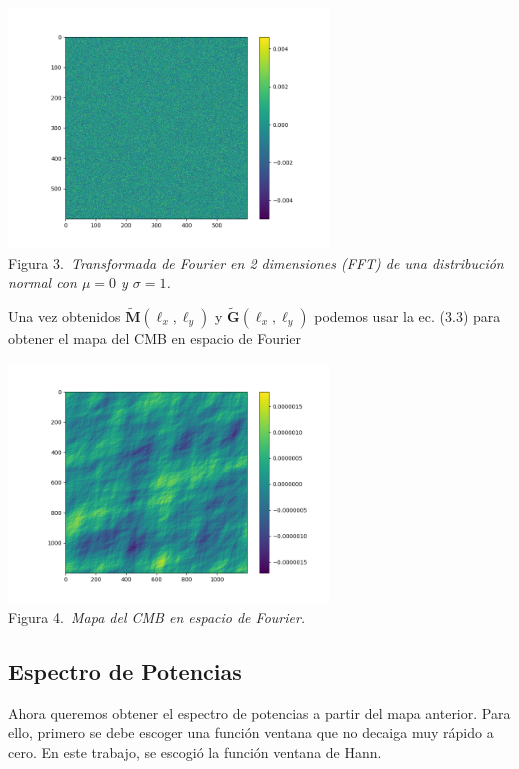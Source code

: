 \documentclass[twocolumn,letterpaper,spanish]{revtex4}
\numberwithin{equation}{section}
\begin{document}
\begin{center}
   \includegraphics[width=85mm]{G_ell.png}\\
   Figura 3.\emph{\ Transformada de Fourier en 2 dimensiones (FFT) de una distribuci\'on normal con $\mu=0$ y $\sigma=1$.}
\end{center}

Una vez obtenidos $\tilde{\mathbf{M}}(\ell_x, \ell_y)$ y $\tilde{\mathbf{G}}(\ell_x, \ell_y)$ podemos usar la ec. (3.3) para obtener el mapa del CMB en espacio de Fourier

\begin{center}
   \includegraphics[width=85mm]{M_tetha.png}\\
   Figura 4.\emph{\ Mapa del CMB en espacio de Fourier.}
\end{center}

\subsection{Espectro de Potencias}

Ahora queremos obtener el espectro de potencias a partir del mapa anterior. Para ello, primero se debe escoger una funci\'on ventana que no decaiga muy r\'apido a cero. En este trabajo, se escogi\'o la funci\'on ventana de Hann.
\end{document}
